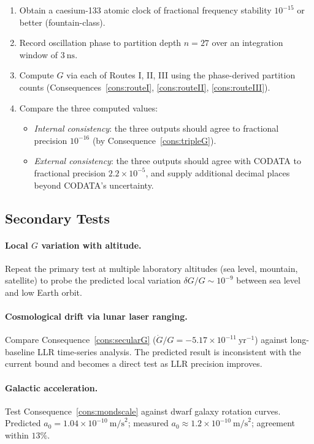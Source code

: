 \begin{enumerate}[label=(\arabic*)]
\item Obtain a caesium-133 atomic clock of fractional frequency stability
  $10^{-15}$ or better (fountain-class).
\item Record oscillation phase to partition depth $n = 27$ over an integration
  window of $3~\mathrm{ns}$.
\item Compute $G$ via each of Routes I, II, III using the phase-derived
  partition counts (Consequences~\ref{cons:routeI}, \ref{cons:routeII},
  \ref{cons:routeIII}).
\item Compare the three computed values:
  \begin{itemize}
  \item \emph{Internal consistency}: the three outputs should agree to
    fractional precision $10^{-16}$ (by Consequence~\ref{cons:tripleG}).
  \item \emph{External consistency}: the three outputs should agree with CODATA
    to fractional precision $2.2\times10^{-5}$, and supply additional decimal
    places beyond CODATA's uncertainty.
  \end{itemize}
\end{enumerate}

\subsection{Secondary Tests}

\paragraph{Local $G$ variation with altitude.}
Repeat the primary test at multiple laboratory altitudes (sea level, mountain,
satellite) to probe the predicted local variation $\delta G/G \sim 10^{-9}$
between sea level and low Earth orbit.

\paragraph{Cosmological drift via lunar laser ranging.}
Compare Consequence~\ref{cons:secularG} ($\dot{G}/G = -5.17\times10^{-11}~\mathrm{yr}^{-1}$)
against long-baseline LLR time-series analysis.
The predicted result is inconsistent with the current bound and becomes a
direct test as LLR precision improves.

\paragraph{Galactic acceleration.}
Test Consequence~\ref{cons:mondscale} against dwarf galaxy rotation curves.
Predicted $a_{0} = 1.04\times10^{-10}~\mathrm{m/s}^{2}$; measured
$a_{0} \approx 1.2\times10^{-10}~\mathrm{m/s}^{2}$; agreement within $13\%$.

